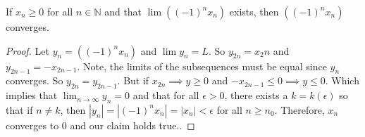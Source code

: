 \documentclass[12pt]{article}
\newcommand{\N}{\mathbb{N}}
\newcommand{\nifty}{\lim_{n \rightarrow \infty}}
\newenvironment{claim}[2][Claim]{\begin{trivlist}
		\item[\hskip \labelsep {\bfseries #1}\hskip \labelsep {\bfseries #2}]}{\end{trivlist}}
\begin{document}
\begin{claim}{3.4.11}
	If $x_n \geq 0$ for all $n \in \N$ and that $\lim ((-1)^n x_n)$ exists, then $ ((-1)^n x_n)$ converges.
\end{claim}
\begin{proof}
	Let $y_n =  ((-1)^n x_n)$ and $\lim y_n = L$. So $y_{2n} = x_2n$ and $y_{2n-1 } = -x_{2n-1}$. Note, the limits of the subsequences must be equal since $y_n$ converges. So $y_{2n} = y_{2n-1}$. But if $x_{2n} \implies y \geq 0$ and $-x_{2n-1} \leq 0 \implies y \leq 0$. Which implies that $\nifty y_n = 0$ and that for all $\epsilon > 0$, there exists a $k = k(\epsilon)$ so that if $n \neq k$, then $|y_n| = |(-1)^nx_n| = |x_n| < \epsilon$ for all $n \geq n_0$. Therefore, $x_n$ converges to $0$ and our claim holds true..
\end{proof}
\end{document}
